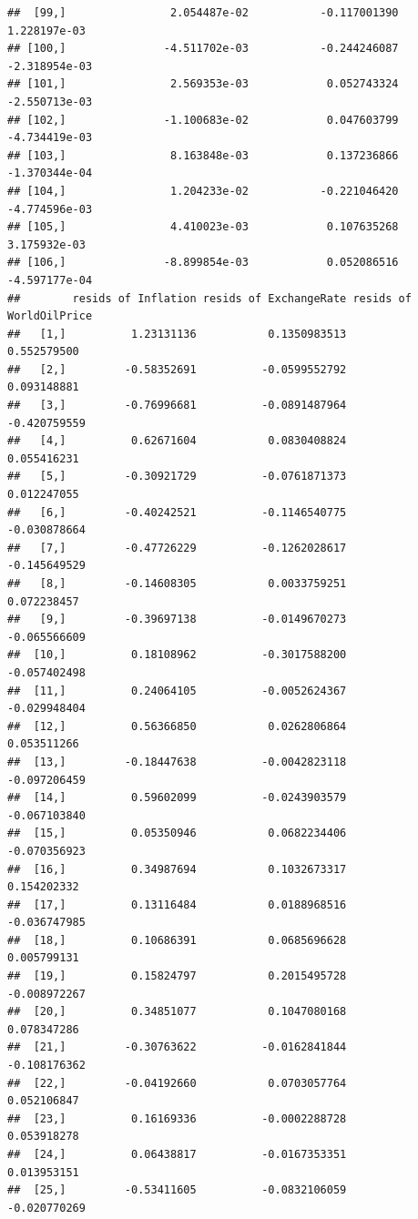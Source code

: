 \documentclass[11pt,preprint, authoryear]{elsarticle}
\numberwithin{equation}{section}
\numberwithin{figure}{section}
\numberwithin{table}{section}
\begin{document}
\begin{verbatim}
##  [99,]                2.054487e-02           -0.117001390      1.228197e-03
## [100,]               -4.511702e-03           -0.244246087     -2.318954e-03
## [101,]                2.569353e-03            0.052743324     -2.550713e-03
## [102,]               -1.100683e-02            0.047603799     -4.734419e-03
## [103,]                8.163848e-03            0.137236866     -1.370344e-04
## [104,]                1.204233e-02           -0.221046420     -4.774596e-03
## [105,]                4.410023e-03            0.107635268      3.175932e-03
## [106,]               -8.899854e-03            0.052086516     -4.597177e-04
##        resids of Inflation resids of ExchangeRate resids of WorldOilPrice
##   [1,]          1.23131136           0.1350983513             0.552579500
##   [2,]         -0.58352691          -0.0599552792             0.093148881
##   [3,]         -0.76996681          -0.0891487964            -0.420759559
##   [4,]          0.62671604           0.0830408824             0.055416231
##   [5,]         -0.30921729          -0.0761871373             0.012247055
##   [6,]         -0.40242521          -0.1146540775            -0.030878664
##   [7,]         -0.47726229          -0.1262028617            -0.145649529
##   [8,]         -0.14608305           0.0033759251             0.072238457
##   [9,]         -0.39697138          -0.0149670273            -0.065566609
##  [10,]          0.18108962          -0.3017588200            -0.057402498
##  [11,]          0.24064105          -0.0052624367            -0.029948404
##  [12,]          0.56366850           0.0262806864             0.053511266
##  [13,]         -0.18447638          -0.0042823118            -0.097206459
##  [14,]          0.59602099          -0.0243903579            -0.067103840
##  [15,]          0.05350946           0.0682234406            -0.070356923
##  [16,]          0.34987694           0.1032673317             0.154202332
##  [17,]          0.13116484           0.0188968516            -0.036747985
##  [18,]          0.10686391           0.0685696628             0.005799131
##  [19,]          0.15824797           0.2015495728            -0.008972267
##  [20,]          0.34851077           0.1047080168             0.078347286
##  [21,]         -0.30763622          -0.0162841844            -0.108176362
##  [22,]         -0.04192660           0.0703057764             0.052106847
##  [23,]          0.16169336          -0.0002288728             0.053918278
##  [24,]          0.06438817          -0.0167353351             0.013953151
##  [25,]         -0.53411605          -0.0832106059            -0.020770269

\end{verbatim}
\end{document}

